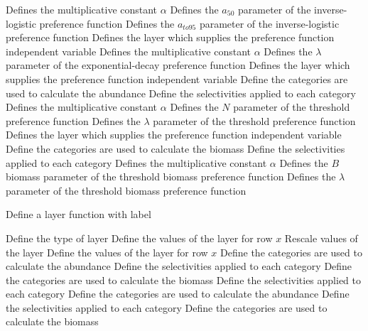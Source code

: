  {Defines the multiplicative constant $\alpha$}
 {Defines the $a_{50}$ parameter of the inverse-logistic preference function}
 {Defines the $a_{to95}$ parameter of the inverse-logistic preference function}
 {Defines the layer which supplies the preference function independent variable}
 {Defines the multiplicative constant $\alpha$}
 {Defines the $\lambda$ parameter of the exponential-decay preference function}
 {Defines the layer which supplies the preference function independent variable}
 {Define the categories are used to calculate the abundance}
 {Define the selectivities applied to each category}
 {Defines the multiplicative constant $\alpha$}
 {Defines the $N$ parameter of the threshold preference function}
 {Defines the $\lambda$ parameter of the threshold preference function}
 {Defines the layer which supplies the preference function independent variable}
 {Define the categories are used to calculate the biomass}
 {Define the selectivities applied to each category}
 {Defines the multiplicative constant $\alpha$}
 {Defines the $B$ biomass parameter of the threshold biomass preference function}
 {Defines the $\lambda$ parameter of the threshold biomass preference function}
\par {} {Define a layer function with label}\par \par
{} {Define the type of layer}
 {Define the values of the layer for row $x$}
 {Rescale values of the layer}
 {Define the values of the layer for row $x$}
 {Define the categories are used to calculate the abundance}
 {Define the selectivities applied to each category}
 {Define the categories are used to calculate the biomass}
 {Define the selectivities applied to each category}
 {Define the categories are used to calculate the abundance}
 {Define the selectivities applied to each category}
 {Define the categories are used to calculate the biomass}
